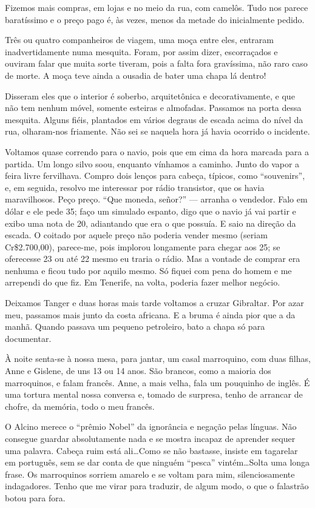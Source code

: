 Fizemos mais compras, em lojas e no meio da rua, com camelôs. Tudo nos parece baratíssimo e o preço pago é, às vezes, menos da metade do inicialmente pedido.

Três ou quatro companheiros de viagem, uma moça entre eles, entraram inadvertidamente numa mesquita. Foram, por assim dizer, escorraçados e ouviram falar que muita sorte tiveram, pois a falta fora gravíssima, não raro caso de morte. A moça teve ainda a ousadia de bater uma chapa lá dentro!

Disseram eles que o interior é soberbo, arquitetônica e decorativamente, e que não tem nenhum móvel, somente esteiras e almofadas. Passamos na porta dessa mesquita. Alguns fiéis, plantados em vários degraus de escada acima do nível da rua, olharam-nos friamente. Não sei se naquela hora já havia ocorrido o incidente.

Voltamos quase correndo para o navio, pois que em cima da hora marcada para a partida. Um longo silvo soou, enquanto vínhamos a caminho. Junto do vapor a feira livre fervilhava. Compro dois lenços para cabeça, típicos, como ``souvenirs'', e, em seguida, resolvo me interessar por rádio transistor, que os havia maravilhosos. Peço preço. ``Que moneda, señor?'' --- arranha o vendedor. Falo em dólar e ele pede 35; faço um simulado espanto, digo que o navio já vai partir e exibo uma nota de 20, adiantando que era o que possuía. E saio na direção da escada. O coitado por aquele preço não poderia vender mesmo (seriam Cr\$2.700,00), parece-me, pois implorou longamente para chegar aos 25; se oferecesse 23 ou até 22 mesmo eu traria o rádio. Mas a vontade de comprar era nenhuma e ficou tudo por aquilo mesmo. Só fiquei com pena do homem e me arrependi do que fiz. Em Tenerife, na volta, poderia fazer melhor negócio.

Deixamos Tanger e duas horas mais tarde voltamos a cruzar Gibraltar. Por azar meu, passamos mais junto da costa africana. E a bruma é ainda pior que a da manhã. Quando passava um pequeno petroleiro, bato a chapa só para documentar.

À noite senta-se à nossa mesa, para jantar, um casal marroquino, com duas filhas, Anne e Gislene, de uns 13 ou 14 anos. São brancos, como a maioria dos marroquinos, e falam francês. Anne, a mais velha, fala um pouquinho de inglês. É uma tortura mental nossa conversa e, tomado de surpresa, tenho de arrancar de chofre, da memória, todo o meu francês.

O Alcino merece o ``prêmio Nobel'' da ignorância e negação pelas línguas. Não consegue guardar absolutamente nada e se mostra incapaz de aprender sequer uma palavra. Cabeça ruim está ali\ldots Como se não bastasse, insiste em tagarelar em português, sem se dar conta de que ninguém ``pesca'' vintém\ldots Solta uma longa frase. Os marroquinos sorriem amarelo e se voltam para mim, silenciosamente indagadores. Tenho que me virar para traduzir, de algum modo, o que o falastrão botou para fora.

